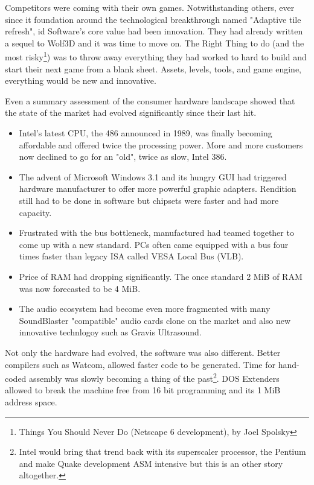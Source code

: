 Competitors were coming with their own games. Notwithstanding others, ever since it foundation around the technological breakthrough named "Adaptive tile refresh", id Software's core value had been innovation. They had already written a sequel to Wolf3D and it was time to move on. The Right Thing to do (and the most risky\footnote{Things You Should Never Do (Netscape 6 development), by Joel Spolsky}) was to throw away everything they had worked to hard to build and start their next game from a blank sheet. Assets, levels, tools, and game engine, everything would be new and innovative.\\
\par
Even a summary assessment of the consumer hardware landscape showed that the state of the market had evolved significantly since their last hit.\\
\begin{itemize}
\item Intel's latest CPU, the 486 announced in 1989, was finally becoming affordable and offered twice the processing power. More and more customers now declined to go for an "old", twice as slow, Intel 386. 
\item The advent of Microsoft Windows 3.1 and its hungry GUI had triggered hardware manufacturer to offer more powerful graphic adapters. Rendition still had to be done in software but chipsets were faster and had more capacity.
\item Frustrated with the bus bottleneck, manufactured had teamed together to come up with a new standard. PCs often came equipped with a bus four times faster than legacy ISA called VESA Local Bus (VLB). 
\item Price of RAM had dropping significantly. The once standard 2 MiB of RAM was now forecasted to be 4 MiB. 
\item The audio ecosystem had become even more fragmented with many SoundBlaster "compatible" audio cards clone on the market and also new innovative technlogoy such as Gravis Ultrasound.\\
\end{itemize}
 \par 
 Not only the hardware had evolved, the software was also different. Better compilers such as Watcom, allowed faster code to be generated. Time for hand-coded assembly was slowly becoming a thing of the past\footnote{Intel would bring that trend back with its superscaler processor, the Pentium and make Quake development ASM intensive but this is an other story altogether.}. DOS Extenders allowed to break the machine free from 16 bit programming and its 1 MiB address space.\\
